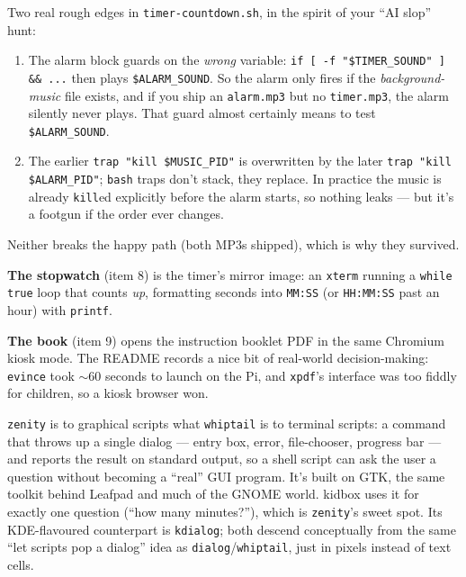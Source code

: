 \documentclass[11pt,oneside]{article}
\newcommand{\code}[1]{\texorpdfstring{\textcolor{kbblue}{\texttt{#1}}}{#1}}
\newcommand{\file}[1]{\textcolor{kbteal}{\texttt{#1}}}
\begin{document}
\begin{fieldnote}
Two real rough edges in \file{timer-countdown.sh}, in the spirit of your ``AI
slop'' hunt:
\begin{enumerate}
\item The alarm block guards on the \emph{wrong} variable:
\code{if [ -f "\$TIMER\_SOUND" ] \&\& ...} then plays \code{\$ALARM\_SOUND}. So
the alarm only fires if the \emph{background-music} file exists, and if you ship
an \texttt{alarm.mp3} but no \texttt{timer.mp3}, the alarm silently never plays.
That guard almost certainly means to test \code{\$ALARM\_SOUND}.
\item The earlier \code{trap "kill \$MUSIC\_PID"} is overwritten by the later
\code{trap "kill \$ALARM\_PID"}; \texttt{bash} traps don't stack, they replace.
In practice the music is already \texttt{kill}ed explicitly before the alarm
starts, so nothing leaks --- but it's a footgun if the order ever changes.
\end{enumerate}
Neither breaks the happy path (both MP3s shipped), which is why they survived.
\end{fieldnote}

\textbf{The stopwatch} (item 8) is the timer's mirror image: an \texttt{xterm}
running a \code{while true} loop that counts \emph{up}, formatting seconds into
\code{MM:SS} (or \code{HH:MM:SS} past an hour) with \texttt{printf}.

\textbf{The book} (item 9) opens the instruction booklet PDF in the same
Chromium kiosk mode. The README records a nice bit of real-world decision-making:
\texttt{evince} took $\sim$60 seconds to launch on the Pi, and \texttt{xpdf}'s
interface was too fiddly for children, so a kiosk browser won.

\begin{deeper}
\texttt{zenity} is to graphical scripts what \texttt{whiptail} is to terminal
scripts: a command that throws up a single dialog --- entry box, error,
file-chooser, progress bar --- and reports the result on standard output, so a
shell script can ask the user a question without becoming a ``real'' GUI program.
It's built on GTK, the same toolkit behind Leafpad and much of the GNOME world.
kidbox uses it for exactly one question (``how many minutes?''), which is
\texttt{zenity}'s sweet spot. Its KDE-flavoured counterpart is
\texttt{kdialog}; both descend conceptually from the same ``let scripts pop a
dialog'' idea as \texttt{dialog}/\texttt{whiptail}, just in pixels instead of
text cells.
\end{deeper}
\end{document}
